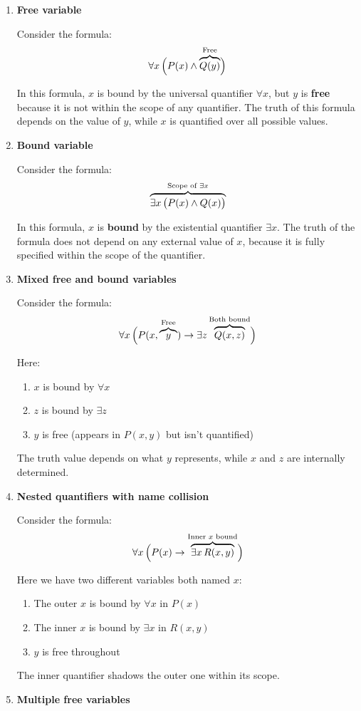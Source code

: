 \documentclass[12pt,a4paper,openany]{article}
\begin{document}
\begin{enumerate}
\item
    \textbf{Free variable}

    Consider the formula:
    \[
    \forall x \, \Big(
    P(x) \wedge
    {\color{black}\overbrace{\color{black}Q(y)}^{\color{black}\text{Free}}}
    \Big)
    \]

    In this formula, $x$ is bound by the universal quantifier $\forall x$, but $y$ is \textbf{free} because it is not within the scope of any quantifier. The truth of this formula depends on the value of $y$, while $x$ is quantified over all possible values.
\item
    \textbf{Bound variable}

    Consider the formula:
    \[
    {\color{black}\overbrace{\color{black}\exists x\,
    \big(
    P(x) \wedge Q(x)
    \big)
    }^{\color{black}\text{Scope of } \exists x}}
    \]

    In this formula, $x$ is \textbf{bound} by the existential quantifier $\exists x$. The truth of the formula does not depend on any external value of $x$, because it is fully specified within the scope of the quantifier.
\item
    \textbf{Mixed free and bound variables}

    Consider the formula:
    \[
    \forall x \, \Big(
    P(x, {\color{black}\overbrace{\color{black}y}^{\color{black}\text{Free}}}) \rightarrow
    \exists z \,
    {\color{black}\overbrace{\color{black}Q(x, z)}^{\color{black}\text{Both bound}}}
    \Big)
    \]

    Here:
    \begin{enumerate}
        \item $x$ is bound by $\forall x$
        \item $z$ is bound by $\exists z$
        \item $y$ is free (appears in $P(x,y)$ but isn't quantified)
    \end{enumerate}
    The truth value depends on what $y$ represents, while $x$ and $z$ are internally determined.
\item
    \textbf{Nested quantifiers with name collision}

    Consider the formula:
    \[
    \forall x \, \Big(
    P(x) \rightarrow
    {\color{black}\overbrace{\color{black}\exists x \, R(x, y)}^{\color{black}\text{Inner } x \text{ bound}}}
    \Big)
    \]

    Here we have two different variables both named $x$:
    \begin{enumerate}
        \item The outer $x$ is bound by $\forall x$ in $P(x)$
        \item The inner $x$ is bound by $\exists x$ in $R(x,y)$
        \item $y$ is free throughout
    \end{enumerate}
    The inner quantifier shadows the outer one within its scope.
\item
    \textbf{Multiple free variables}


\end{enumerate}
\end{document}

